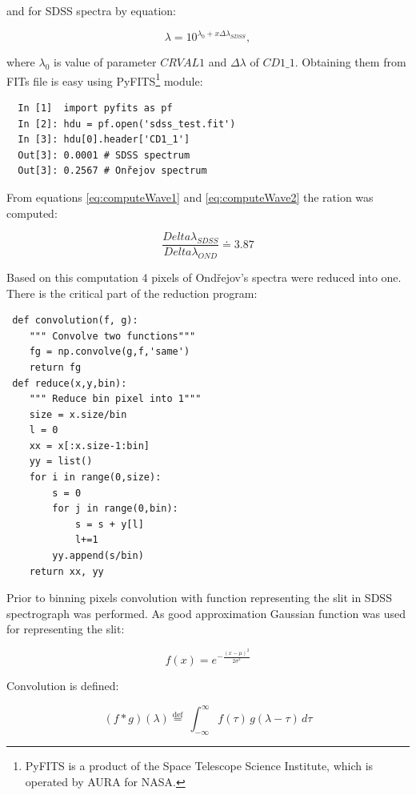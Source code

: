 and for SDSS spectra by equation:

\begin{equation}
  \label{eq:computeWave2}
  \lambda = 10^{\lambda_0 + x\Delta\lambda_{SDSS}},
\end{equation}

where $\lambda_0$ is value of parameter $CRVAL1$ and $\Delta\lambda$
of $CD1\_1$. Obtaining them from FITs file is easy using
\textrm{PyFITS}\footnote{PyFITS is a product of the Space Telescope
  Science Institute, which is operated by AURA for NASA.}  module:

\begin{lstlisting}
  In [1]  import pyfits as pf
  In [2]: hdu = pf.open('sdss_test.fit')
  In [3]: hdu[0].header['CD1_1']
  Out[3]: 0.0001 # SDSS spectrum 
  Out[3]: 0.2567 # Onřejov spectrum
\end{lstlisting}


From equations \ref{eq:computeWave1} and \ref{eq:computeWave2} the ration
was computed:

\begin{equation}
  \label{eq:ratio}
  \frac{Delta\lambda_{SDSS}}{Delta\lambda_{OND}} \doteq  3.87
\end{equation}

Based on this computation 4 pixels of Ondřejov's spectra were reduced
into one. There is the critical part of the reduction program:

\begin{lstlisting}
 def convolution(f, g):
    """ Convolve two functions"""
    fg = np.convolve(g,f,'same')
    return fg
 def reduce(x,y,bin):
    """ Reduce bin pixel into 1"""
    size = x.size/bin
    l = 0
    xx = x[:x.size-1:bin]
    yy = list()
    for i in range(0,size):
        s = 0
        for j in range(0,bin):
            s = s + y[l]
            l+=1
        yy.append(s/bin)
    return xx, yy
\end{lstlisting}

Prior to binning pixels convolution with function representing the slit
in SDSS spectrograph was performed. As good approximation Gaussian
function was used for representing the slit:

\begin{equation}
  \label{eq:gauss}
  f(x) =  e^{- { \frac{(x-\mu)^2 }{ 2 \sigma^2} } }
\end{equation}

 Convolution is defined:

\begin{equation}
  \label{eq:convolution}
  (f * g )(\lambda) \stackrel{\mathrm{def}}{=}\ \int_{-\infty}^{\infty} f(\tau)\, g(\lambda - \tau)\, d\tau
\end{equation}
 
